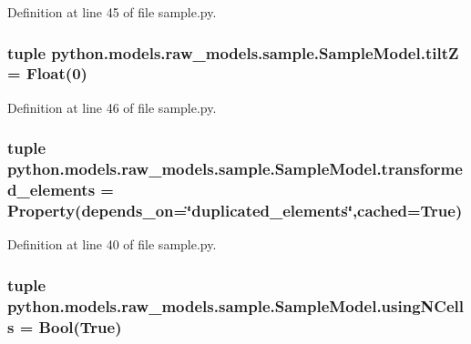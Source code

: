 Definition at line 45 of file sample.\-py.

\hypertarget{classpython_1_1models_1_1raw__models_1_1sample_1_1_sample_model_a56ac27856180a15688fbaf1a5173864b}{
\subsubsection[{tilt\-Z}]{\setlength{\rightskip}{0pt plus 5cm}tuple python.\-models.\-raw\-\_\-models.\-sample.\-Sample\-Model.\-tilt\-Z = Float(0)\hspace{0.3cm}{\ttfamily [static]}}}\label{classpython_1_1models_1_1raw__models_1_1sample_1_1_sample_model_a56ac27856180a15688fbaf1a5173864b}


Definition at line 46 of file sample.\-py.

\hypertarget{classpython_1_1models_1_1raw__models_1_1sample_1_1_sample_model_a76199cbd9483dd4c5f2cdb6605066a52}{
\subsubsection[{transformed\-\_\-elements}]{\setlength{\rightskip}{0pt plus 5cm}tuple python.\-models.\-raw\-\_\-models.\-sample.\-Sample\-Model.\-transformed\-\_\-elements = Property(depends\-\_\-on=\char`\"{}duplicated\-\_\-elements\char`\"{},cached=True)\hspace{0.3cm}{\ttfamily [static]}}}\label{classpython_1_1models_1_1raw__models_1_1sample_1_1_sample_model_a76199cbd9483dd4c5f2cdb6605066a52}


Definition at line 40 of file sample.\-py.

\hypertarget{classpython_1_1models_1_1raw__models_1_1sample_1_1_sample_model_afe92bf705b978a0959224aa2ca19668a}{
\subsubsection[{using\-N\-Cells}]{\setlength{\rightskip}{0pt plus 5cm}tuple python.\-models.\-raw\-\_\-models.\-sample.\-Sample\-Model.\-using\-N\-Cells = Bool(True)\hspace{0.3cm}{\ttfamily [static]}}}\label{classpython_1_1models_1_1raw__models_1_1sample_1_1_sample_model_afe92bf705b978a0959224aa2ca19668a}


